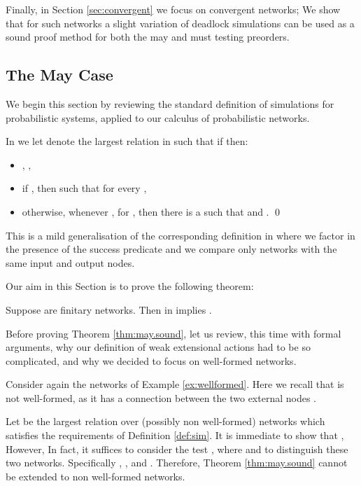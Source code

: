 \documentclass{LMCS}
\begin{document}
Finally, in Section \ref{sec:convergent} we focus on convergent 
networks; We show that for such networks a slight 
variation of deadlock simulations can be used as 
a sound proof method for both the may and must testing 
preorders.

\subsection{The May Case}
\label{sec:may.sound}
We begin this section by reviewing the standard definition 
of simulations for probabilistic systems, applied to 
our calculus of probabilistic networks.
\begin{defi}\rm\label{def:sim}
In   we let 
  denote the largest relation in 
such that if  then:
\begin{itemize}
\item , ,
\item 
if , then 
  such that for every ,

\item otherwise, whenever , for , then
  there is a  such that 
   and .
\qed
\end{itemize}


\end{defi}
\noindent
This is a mild generalisation of the corresponding definition in \cite{DGHM09full} where we factor in the 
presence of the success predicate  and we compare only networks with the 
same input and output nodes. 

Our aim in this Section is to prove the following theorem:
\begin{thm}
\label{thm:may.sound}
Suppose  are finitary networks.
Then   in   
implies .
\end{thm}

Before proving Theorem \ref{thm:may.sound}, let us review, this time with 
formal arguments, why our definition 
of weak extensional actions had to be so complicated, and why 
we decided to focus on well-formed networks.

\begin{exa}
\label{ex:sound.wellformed}
Consider again the networks  of 
Example \ref{ex:wellformed}. Here we recall 
that  is not well-formed, as it has 
a connection between the two external nodes 
. 

Let  be the largest relation over 
(possibly non well-formed) networks which satisfies the requirements 
of Definition \ref{def:sim}.
It is immediate to show that , 
However,   
In fact, it suffices to consider the test 
, where 
 and  
to distinguish these two networks. Specifically 
, 
, 
and . 
Therefore, Theorem \ref{thm:may.sound} cannot 
be extended to non well-formed networks.
\end{exa}
\end{document}
